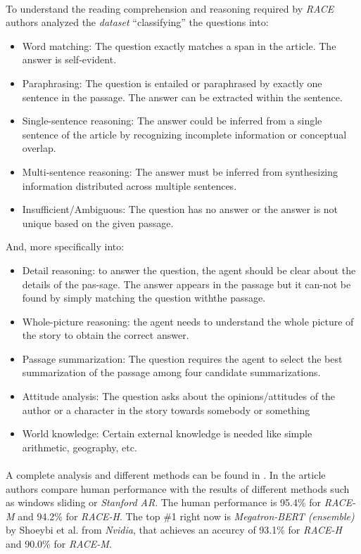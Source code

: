 \paragraph{}
To understand the reading comprehension and reasoning required by \emph{RACE} authors analyzed the \emph{dataset} ``classifying'' the questions into:
\begin{itemize}
	\item Word  matching: The  question  exactly matches a span in the article. The answer is self-evident.
	\item Paraphrasing: The question is entailed or paraphrased by exactly one sentence in the passage. The answer can be extracted within the sentence.
	\item Single-sentence reasoning: The answer could be inferred from a single sentence of the article by recognizing incomplete information or conceptual overlap.
	\item Multi-sentence reasoning: The answer must be inferred from synthesizing information distributed across multiple sentences.
	\item Insufficient/Ambiguous: The question has no answer or the answer is not unique based on the given passage.
\end{itemize}
And, more specifically into:
\begin{itemize}
\item Detail reasoning: to answer the question, the agent should be clear about the details of the pas-sage. The answer appears in the passage but it can-not be found by simply matching the question withthe passage. 
\item Whole-picture reasoning: the agent needs to understand the whole picture of the story to obtain the correct answer. 
\item Passage summarization: The question requires the agent to select the best summarization of the passage among four candidate summarizations. 
\item Attitude analysis: The question asks about the opinions/attitudes of the author or a character in the story towards somebody or something
\item World knowledge: Certain external knowledge is needed like simple arithmetic, geography, etc.
\end{itemize}
\paragraph{}
A complete analysis and different methods can be found in \cite{Lai2017}. In the article authors compare human performance with the results of different methods such as windows sliding or \emph{Stanford AR}. The human performance is 95.4\% for \emph{RACE-M} and 94.2\% for \emph{RACE-H}. The top \#1 right now is \emph{Megatron-BERT (ensemble)}\cite{Shoeybi2019} by Shoeybi et al. from \emph{Nvidia}, that achieves an accurcy of 93.1\% for \emph{RACE-H}	and 90.0\% for \emph{RACE-M}.
